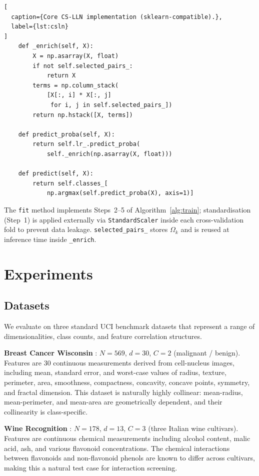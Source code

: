 \documentclass[conference]{IEEEtran}
\begin{document}
\begin{lstlisting}[
  caption={Core CS-LLN implementation (sklearn-compatible).},
  label={lst:csln}
]
    def _enrich(self, X):
        X = np.asarray(X, float)
        if not self.selected_pairs_:
            return X
        terms = np.column_stack(
            [X[:, i] * X[:, j]
             for i, j in self.selected_pairs_])
        return np.hstack([X, terms])

    def predict_proba(self, X):
        return self.lr_.predict_proba(
            self._enrich(np.asarray(X, float)))

    def predict(self, X):
        return self.classes_[
            np.argmax(self.predict_proba(X), axis=1)]
\end{lstlisting}

The \texttt{fit} method implements Steps~2--5 of Algorithm~\ref{alg:train};
standardisation (Step~1) is applied externally via \texttt{StandardScaler}
inside each cross-validation fold to prevent data leakage.
\texttt{selected\_pairs\_} stores $\Omega_k$ and is reused at inference time
inside \texttt{\_enrich}.

\section{Experiments}
\label{sec:exp}

\subsection{Datasets}
\label{sec:datasets}

We evaluate on three standard UCI benchmark datasets that represent a range
of dimensionalities, class counts, and feature correlation structures.

\noindent\textbf{Breast Cancer Wisconsin} \cite{street1993}: $N = 569$,
$d = 30$, $C = 2$ (malignant / benign).
Features are 30 continuous measurements derived from cell-nucleus images,
including mean, standard error, and worst-case values of radius, texture,
perimeter, area, smoothness, compactness, concavity, concave points,
symmetry, and fractal dimension.
This dataset is naturally highly collinear: mean-radius, mean-perimeter, and
mean-area are geometrically dependent, and their collinearity is
class-specific.

\noindent\textbf{Wine Recognition} \cite{forina1991}: $N = 178$, $d = 13$,
$C = 3$ (three Italian wine cultivars).
Features are continuous chemical measurements including alcohol content,
malic acid, ash, and various flavonoid concentrations.
The chemical interactions between flavonoids and non-flavonoid phenols are
known to differ across cultivars, making this a natural test case for
interaction screening.
\end{document}
